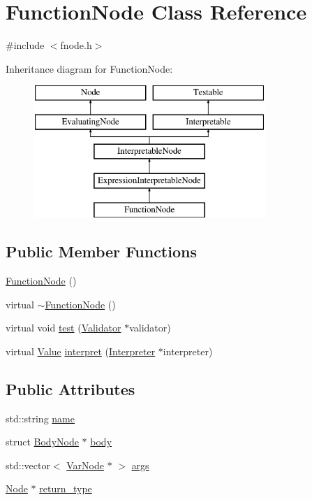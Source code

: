 \hypertarget{classFunctionNode}{}\section{Function\+Node Class Reference}
\label{classFunctionNode}


{\ttfamily \#include $<$fnode.\+h$>$}

Inheritance diagram for Function\+Node\+:\begin{figure}[H]
\begin{center}
\leavevmode
\includegraphics[height=5.000000cm]{classFunctionNode}
\end{center}
\end{figure}
\subsection*{Public Member Functions}
\begin{DoxyCompactItemize}
\item 
\hyperlink{classFunctionNode_ac4467a4c13382e0058cb2bd4fb70e0ab}{Function\+Node} ()
\item 
virtual \hyperlink{classFunctionNode_ad9c4a35db175de9386ac86d91a1a95df}{$\sim$\+Function\+Node} ()
\item 
virtual void \hyperlink{classFunctionNode_a1f020e7ea0181b3ce16ad2ef8426f773}{test} (\hyperlink{classValidator}{Validator} $\ast$validator)
\item 
virtual \hyperlink{classValue}{Value} \hyperlink{classFunctionNode_a059e6682cd51d0e126372a7af257ea5a}{interpret} (\hyperlink{classInterpreter}{Interpreter} $\ast$interpreter)
\end{DoxyCompactItemize}
\subsection*{Public Attributes}
\begin{DoxyCompactItemize}
\item 
std\+::string \hyperlink{classFunctionNode_a21284dd655c91da1f792dc3bc1bba60c}{name}
\item 
struct \hyperlink{classBodyNode}{Body\+Node} $\ast$ \hyperlink{classFunctionNode_a3ebe1489837aee643b7e9f626ef0976a}{body}
\item 
std\+::vector$<$ \hyperlink{classVarNode}{Var\+Node} $\ast$ $>$ \hyperlink{classFunctionNode_a04bfceaf29255ffd83195f669b5c37ef}{args}
\item 
\hyperlink{classNode}{Node} $\ast$ \hyperlink{classFunctionNode_a52768e57ce61d19f974c5c7412168377}{return\+\_\+type}
\end{DoxyCompactItemize}
